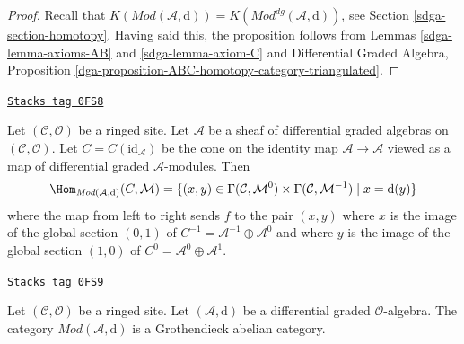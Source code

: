 \begin{proof}

Recall that $K(\textit{Mod}(\mathcal{A}, \text{d})) =
K(\textit{Mod}^{dg}(\mathcal{A}, \text{d}))$, see
Section \ref{sdga-section-homotopy}.
Having said this, the proposition
follows from Lemmas \ref{sdga-lemma-axioms-AB} and \ref{sdga-lemma-axiom-C}
and
Differential Graded Algebra, Proposition
\ref{dga-proposition-ABC-homotopy-category-triangulated}.
\end{proof}

\begin{remark}
\label{sdga-remark-cone-identity}
\href{https://stacks.math.columbia.edu/tag/0FS8}{\texttt{Stacks tag 0FS8}}

Let $(\mathcal{C}, \mathcal{O})$ be a ringed site.
Let $\mathcal{A}$ be a sheaf of differential graded algebras
on $(\mathcal{C}, \mathcal{O})$. Let $C = C(\text{id}_\mathcal{A})$
be the cone on the identity map $\mathcal{A} \to \mathcal{A}$ viewed
as a map of differential graded $\mathcal{A}$-modules.
Then
$$
\Hom_{\textit{Mod}(\mathcal{A}, \text{d})}(C, \mathcal{M}) =
\{(x, y) \in
\Gamma(\mathcal{C}, \mathcal{M}^0) \times
\Gamma(\mathcal{C}, \mathcal{M}^{-1}) \mid
x = \text{d}(y)\}
$$
where the map from left to right sends $f$ to the pair $(x, y)$
where $x$ is the image of the global section $(0, 1)$ of
$C^{-1} = \mathcal{A}^{-1} \oplus \mathcal{A}^0$ and where
$y$ is the image of the global section $(1, 0)$ of
$C^0 = \mathcal{A}^0 \oplus \mathcal{A}^1$.
\end{remark}

\begin{lemma}
\label{sdga-lemma-dgm-grothendieck-abelian}
\href{https://stacks.math.columbia.edu/tag/0FS9}{\texttt{Stacks tag 0FS9}}

Let $(\mathcal{C}, \mathcal{O})$ be a ringed site.
Let $(\mathcal{A}, \text{d})$ be a differential graded $\mathcal{O}$-algebra.
The category $\textit{Mod}(\mathcal{A}, \text{d})$
is a Grothendieck abelian category.
\end{lemma}

